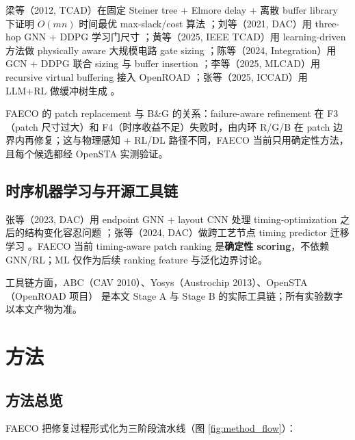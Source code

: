\documentclass[journal]{IEEEtran}
\begin{document}
梁等（2012, TCAD）在固定 Steiner tree + Elmore delay + 离散 buffer library 下证明 $O(mn)$ 时间最优 max-slack/cost 算法 \cite{liang2012buffer}；刘等（2021, DAC）用 three-hop GNN + DDPG 学习门尺寸 \cite{liu2021rlsizer}；黄等（2025, IEEE TCAD）用 learning-driven 方法做 physically aware 大规模电路 gate sizing \cite{huang2025phys}；陈等（2024, Integration）用 GCN + DDPG 联合 sizing 与 buffer insertion \cite{chen2024aito}；李等（2025, MLCAD）用 recursive virtual buffering 接入 OpenROAD \cite{li2025mlbuf}；张等（2025, ICCAD）用 LLM+RL 做缓冲树生成 \cite{zhang2025buffalo}。

FAECO 的 patch replacement 与 B\&G 的关系：failure-aware refinement 在 F3（patch 尺寸过大）和 F4（时序收益不足）失败时，由内环 R/G/B 在 patch 边界内再修复；这与物理感知 + RL/DL 路径不同，FAECO 当前只用确定性方法，且每个候选都经 OpenSTA 实测验证。

\subsection{时序机器学习与开源工具链}

张等（2023, DAC）用 endpoint GNN + layout CNN 处理 timing-optimization 之后的结构变化容忍问题 \cite{zhang2023restructure}；张等（2024, DAC）做跨工艺节点 timing predictor 迁移学习 \cite{zhang2024disentangle}。FAECO 当前 timing-aware patch ranking 是\textbf{确定性 scoring}，不依赖 GNN/RL；ML 仅作为后续 ranking feature 与泛化边界讨论。

工具链方面，ABC（CAV 2010）\cite{brayton2010abc}、Yosys（Austrochip 2013）\cite{wolf2013yosys}、OpenSTA（OpenROAD 项目）\cite{opensta} 是本文 Stage A 与 Stage B 的实际工具链；所有实验数字以本文产物为准。

\section{方法}

\subsection{方法总览}

FAECO 把修复过程形式化为三阶段流水线（图 \ref{fig:method_flow}）：
\end{document}
